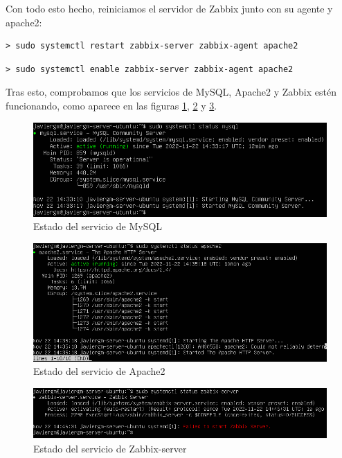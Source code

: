 Con todo esto hecho, reiniciamos el servidor de Zabbix junto con su agente y apache2:

\begin{lstlisting}
> sudo systemctl restart zabbix-server zabbix-agent apache2
\end{lstlisting}

\begin{lstlisting}
> sudo systemctl enable zabbix-server zabbix-agent apache2 
\end{lstlisting}

Tras esto, comprobamos que los servicios de MySQL, Apache2 y Zabbix estén funcionando, como aparece en las figuras \ref{fig:estado-mysql}, \ref{fig:estado-apache} y \ref{fig:estado-zabbix}.


\begin{figure}[H]
  \centering
  \includegraphics[scale=0.9]{Captura6}
  \caption{Estado del servicio de MySQL}
  \label{fig:estado-mysql}
\end{figure}

\begin{figure}[H]
  \centering
  \includegraphics[scale=0.9]{Captura7}
  \caption{Estado del servicio de Apache2}
  \label{fig:estado-apache}
\end{figure}

\begin{figure}[H]
  \centering
  \includegraphics[scale=0.9]{Captura8}
  \caption{Estado del servicio de Zabbix-server}
  \label{fig:estado-zabbix}
\end{figure}

